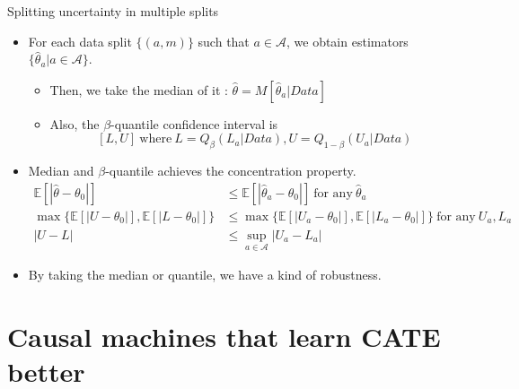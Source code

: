 \documentclass[xcolor=svgnames,aspectratio=169]{beamer}
\newcommand{\E}{\mathbb{E}}
\begin{document}
\begin{frame}{Splitting uncertainty in multiple splits}
    \begin{itemize}
        \item For each data split $\{(a,m)\}$ such that $a\in \mathcal{A} $, we obtain estimators $\{\hat{\theta}_a|a\in\mathcal{A} \}$.
        \begin{itemize}
            \item Then, we take the median of it : $\hat{\theta}=M[\hat{\theta}_a|Data]$
            \item Also, the $\beta$-quantile confidence interval is 
            \[
            [L,U] \  \text{where} \ L=Q_{\beta}(L_a|Data), U=Q_{1-\beta}(U_a|Data)
            \]
        \end{itemize}
        \item Median and $\beta$-quantile achieves the \alert{concentration} property.
        \begin{align*}
            \E[|\hat{\theta}-\theta_0|]&\leq \E[|\hat{\theta}_a-\theta_0|] \ \text{for any} \ \hat{\theta}_a \\
            \max\{\E[|U-\theta_0|], \E[|L-\theta_0|]\}&\leq \max\{\E[|U_a-\theta_0|], \E[|L_a-\theta_0|]\} \ \text{for any} \ U_a, L_a \\
            |U-L|&\leq \sup_{a\in\mathcal{A} }|U_a-L_a|
        \end{align*}
        \item By taking the median or quantile, we have a kind of robustness. 
    \end{itemize}
\end{frame}

\section{Causal machines that learn CATE better}
\end{document}
